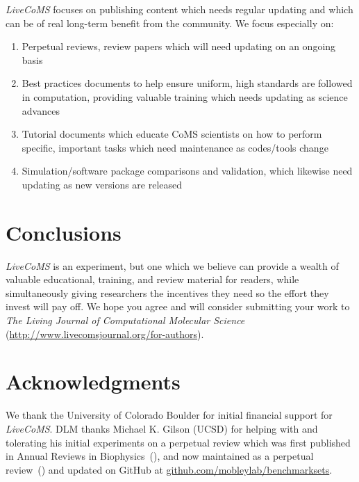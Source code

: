 \documentclass[9pt]{livecoms}
\begin{document}
\emph{LiveCoMS} focuses on publishing content which needs regular updating and which can be of real long-term benefit from the community.
We focus especially on:
\begin{enumerate}
\item Perpetual reviews, review papers which will need updating on an ongoing basis
\item Best practices documents to help ensure uniform, high standards are followed in computation, providing valuable training which needs updating as science advances
\item Tutorial documents which educate CoMS scientists on how to perform specific, important tasks which need maintenance as codes/tools change
\item Simulation/software package comparisons and validation, which likewise need updating as new versions are released
\end{enumerate}

\section{Conclusions}

\emph{LiveCoMS} is an experiment, but one which we believe can provide a wealth of valuable educational, training, and review material for readers, while simultaneously giving researchers the incentives they need so the effort they invest will pay off.
We hope you agree and will consider submitting your work to \emph{The Living Journal of Computational Molecular Science} (\url{http://www.livecomsjournal.org/for-authors}).


\section{Acknowledgments}

We thank the University of Colorado Boulder for initial financial support for \emph{LiveCoMS}. 
DLM thanks Michael K. Gilson (UCSD) for helping with and tolerating his initial experiments on a perpetual review which was first published in Annual Reviews in Biophysics~(\cite{Mobley:2017:AnnualReviewofBiophysics}), and now maintained as a perpetual review~(\cite{Mobley:2017:eScholarshipa}) and updated on GitHub at \url{github.com/mobleylab/benchmarksets}.


\end{document}
